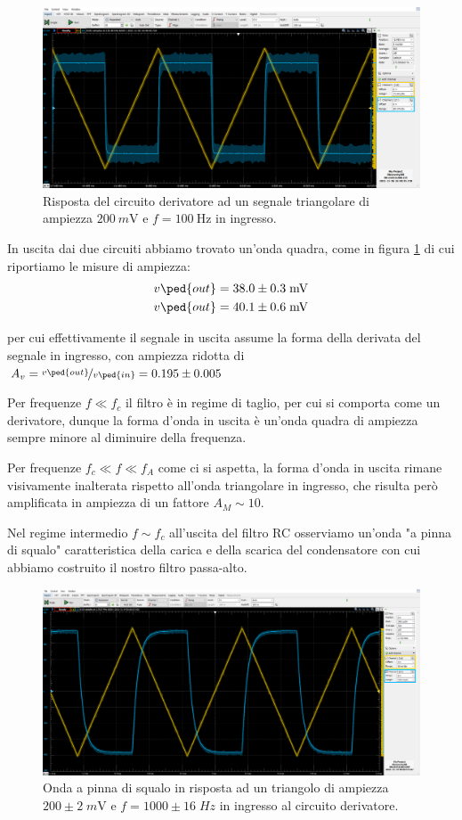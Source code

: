 \documentclass[10pt, a4paper, italian]{article}
\begin{document}
\begin{figure}[htbp]
\centering
\includegraphics[scale=0.4]{derivatore}
\caption{Risposta del circuito derivatore ad un segnale triangolare di ampiezza
$\SI{200}{m\V}$ e $f = \SI{100}{\Hz}$ in ingresso. \label{fig: dertrg}}
\end{figure}

In uscita dai due circuiti abbiamo trovato un'onda quadra, come in figura
\ref{fig: dertrg} di cui riportiamo le misure di ampiezza:
\begin{align*}
v\ped{out} &= 38.0 \pm 0.3 \; \si{m\V} \\
v\ped{out} &= 40.1 \pm 0.6 \; \si{m\V} 
\end{align*}

per cui effettivamente il segnale in uscita assume la forma della derivata
del segnale in ingresso, con ampiezza ridotta di
$A_v = \nicefrac{v\ped{out}}{v\ped{in}} = 0.195 \pm 0.005 $

Per frequenze $f \ll f_c$ il filtro è in regime di taglio, per cui si comporta
come un derivatore, dunque la forma d'onda in uscita è un'onda quadra di
ampiezza sempre minore al diminuire della frequenza.

Per frequenze $f_c \ll f \ll f_A$ come ci si aspetta, la forma d'onda in uscita
rimane visivamente inalterata rispetto all'onda triangolare in ingresso,
che risulta però amplificata in ampiezza di un fattore $A_M \sim 10$.

Nel regime intermedio $f \sim f_c$ all'uscita del filtro RC osserviamo un'onda
"a pinna di squalo" caratteristica della carica e della scarica del
condensatore con cui abbiamo costruito il nostro filtro passa-alto.
\begin{figure}[htbp]
\centering
\includegraphics[scale=0.335]{derfin}
\caption{Onda a pinna di squalo in risposta ad un triangolo di ampiezza
$200 \pm 2 \; \si{m\V}$ e $f = 1000 \pm 16 \; \si{Hz}$ in ingresso al
circuito derivatore. \label{fig: derfin}}
\end{figure}
\end{document}
